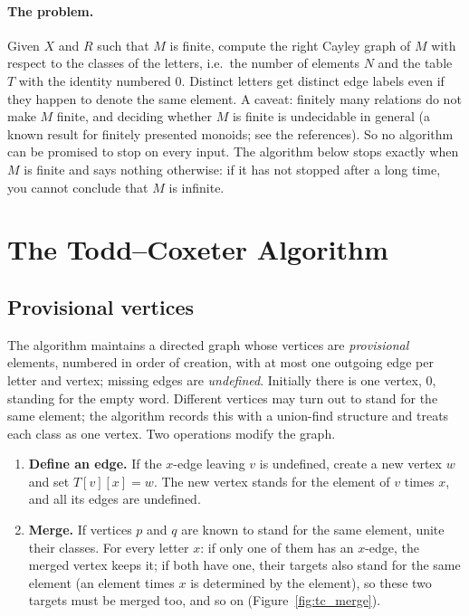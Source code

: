 \documentclass[11pt]{article}
\begin{document}
\paragraph{The problem.} Given $X$ and $R$ such that $M$ is finite, compute the right Cayley graph of $M$ with respect to the classes of the letters, i.e.\ the number of elements $N$ and the table $T$ with the identity numbered $0$.
Distinct letters get distinct edge labels even if they happen to denote the same element.
A caveat: finitely many relations do not make $M$ finite, and deciding whether $M$ is finite is undecidable in general (a known result for finitely presented monoids; see the references).
So no algorithm can be promised to stop on every input. The algorithm below stops exactly when $M$ is finite and says nothing otherwise: if it has not stopped after a long time, you cannot conclude that $M$ is infinite.

\section{The Todd--Coxeter Algorithm}\label{sec:algorithm}
\subsection{Provisional vertices}
The algorithm maintains a directed graph whose vertices are \emph{provisional} elements, numbered in order of creation, with at most one outgoing edge per letter and vertex; missing edges are \emph{undefined}.
Initially there is one vertex, $0$, standing for the empty word. Different vertices may turn out to stand for the same element; the algorithm records this with a union-find structure and treats each class as one vertex.
Two operations modify the graph.
\begin{enumerate}[leftmargin=1.7em]
  \item \textbf{Define an edge.} If the $x$-edge leaving $v$ is undefined, create a new vertex $w$ and set $T[v][x]=w$. The new vertex stands for the element of $v$ times $x$, and all its edges are undefined.
  \item \textbf{Merge.} If vertices $p$ and $q$ are known to stand for the same element, unite their classes. For every letter $x$: if only one of them has an $x$-edge, the merged vertex keeps it;
        if both have one, their targets also stand for the same element (an element times $x$ is determined by the element), so these two targets must be merged too, and so on (Figure~\ref{fig:tc_merge}).
\end{enumerate}
\end{document}
